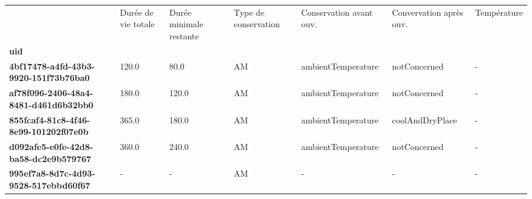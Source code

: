 \begin{tabularx}{\linewidth}{lXXXXXX}
\toprule
{} &  Durée de vie totale &  Durée minimale restante & Type de conservation & Conservation avant ouv. & Convervation après ouv. & Température \\
\textbf{uid                                 } &                      &                          &                      &                         &                         &             \\
\midrule
\textbf{4bf17478-a4fd-43b3-9920-151f73b76ba0} &                120.0 &                     80.0 &                   AM &      ambientTemperature &            notConcerned &           - \\
\textbf{af78f096-2406-48a4-8481-d461d6b32bb0} &                180.0 &                    120.0 &                   AM &      ambientTemperature &            notConcerned &           - \\
\textbf{855fcaf4-81c8-4f46-8e99-101202f07e0b} &                365.0 &                    180.0 &                   AM &      ambientTemperature &         coolAndDryPlace &           - \\
\textbf{d092afe5-e0fe-42d8-ba58-dc2e9b579767} &                360.0 &                    240.0 &                   AM &      ambientTemperature &            notConcerned &           - \\
\textbf{995ef7a8-8d7c-4d93-9528-517ebbd60f67} &                    - &                        - &                   AM &                       - &                       - &           - \\
\bottomrule
\end{tabularx}
